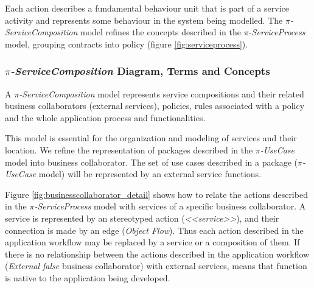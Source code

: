 Each action describes a fundamental behaviour unit that is part of a service
activity and represents some behaviour in the system being
modelled. The \textit{$\pi$-ServiceComposition} model refines the concepts
described in the \textit{$\pi$-ServiceProcess} model, grouping contracts
into policy (figure \ref{fig:serviceprocess}).



\subsubsection{\textit{$\pi$-ServiceComposition} Diagram, Terms and Concepts} 
  


%  
 A \textit{$\pi$-ServiceComposition} model represents service
 compositions and their related business collaborators (external services),
 policies, rules associated with a policy and the whole application
 process and functionalities. 
 
%  
 This model is essential for the organization and modeling of
 services and their location. We refine the representation of packages
 described in the  \textit{$\pi$-UseCase} model into business
 collaborator. The set of use cases described in a package
 (\textit{$\pi$-UseCase} model) will be represented by an external service
 functions.
 
 Figure \ref{fig:businesscollaborator_detail} shows how to relate the actions
 described in the \textit{$\pi$-ServiceProcess} model with services of a specific business
 collaborator. A service is represented by an stereotyped action 
 (\textit{<<service>>}), and their connection is made by an edge (\textit{Object
 Flow}). Thus each action described in the application workflow may be
 replaced by a service or a composition of them. If there is no relationship
 between the actions described in the application workflow (\textit{External
 false} business collaborator) with external services, means that function
 is native to the application being developed.
    
